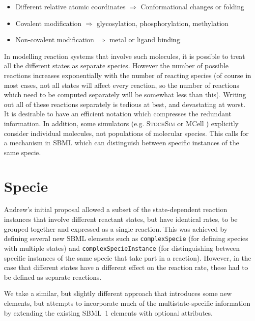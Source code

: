 \documentclass{cekarticle}
\begin{document}
\begin{itemize}
 \item Different relative atomic coordinates $\Rightarrow$ Conformational changes or folding
 \item Covalent modification $\Rightarrow$ glycosylation, phosphorylation, methylation
 \item Non-covalent modification $\Rightarrow$ metal or ligand binding
\end{itemize}

In modelling reaction systems that involve such molecules, it is possible to
treat all the different states as separate species. However the number of
possible reactions increases exponentially with the number of reacting species
(of course in most cases, not all states will affect every reaction, so the
number of reactions which need to be computed separately will be somewhat less
than this).  Writing out all of these reactions separately is tedious at best,
and devastating at worst.  It is desirable to have an efficient notation which
compresses the redundant information.  In addition, some simulators (e.g.
\textsc{StochSim} \citep{Mortonfirth:1998} or MCell \citep{Stiles:1996})
explicitly consider individual molecules, not populations of molecular species.
This calls for a mechanism in SBML which can distinguish between specific
instances of the same specie.

\section{Specie}
\label{sec:species}

Andrew's initial proposal \citep{Finney:2001a} allowed a subset of the
state-dependent reaction instances that involve different reactant states, but
have identical rates, to be grouped together and expressed as a single reaction.
This was achieved by defining several new SBML elements such as
\texttt{complexSpecie} (for defining species with multiple states) and
\texttt{complexSpecieInstance} (for distinguishing between specific instances of
the same specie that take part in a reaction).  However, in the case that
different states have a different effect on the reaction rate, these had to be
defined as separate reactions.

We take a similar, but slightly different approach that introduces some new
elements, but attempts to incorporate much of the multistate-specific
information by extending the existing SBML~1 elements with optional attributes.
\end{document}
